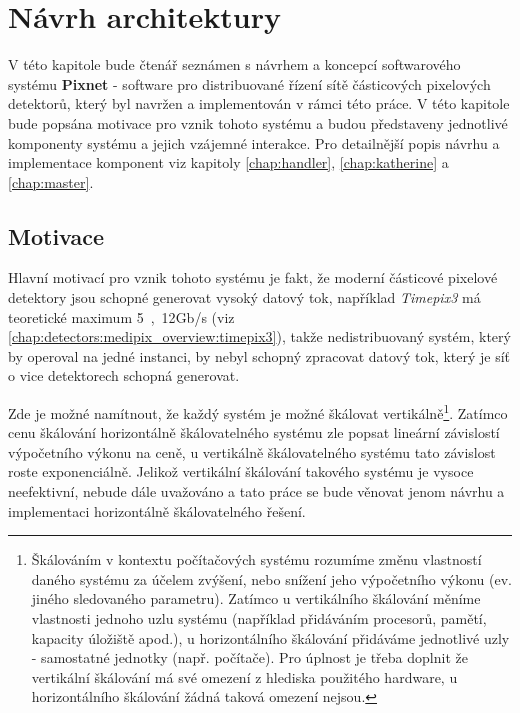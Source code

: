 

\chapter{Návrh architektury}\label{chap:arch}
V této kapitole bude čtenář seznámen s návrhem a koncepcí softwarového systému \textbf{Pixnet} - software pro distribuované řízení sítě částicových pixelových detektorů, který byl navržen a implementován v rámci této práce. V této kapitole bude popsána motivace pro vznik tohoto systému a budou představeny jednotlivé komponenty systému a jejich vzájemné interakce. Pro detailnější popis návrhu a implementace komponent viz kapitoly \ref{chap:handler}, \ref{chap:katherine} a \ref{chap:master}.

\section{Motivace}\label{chap:arch:motivation}
Hlavní motivací pro vznik tohoto systému je fakt, že moderní částicové pixelové detektory jsou schopné generovat vysoký datový tok, například \textit{Timepix3} má teoretické maximum \unit{5,12}{Gb/s} (viz \ref{chap:detectors:medipix_overview:timepix3}), takže nedistribuovaný systém, který by operoval na jedné instanci, by nebyl schopný zpracovat datový tok, který je síť o vice detektorech schopná generovat. 

Zde je možné namítnout, že každý systém je možné škálovat vertikálně\footnote{Škálováním v kontextu počítačových systému rozumíme změnu vlastností daného systému za účelem zvýšení, nebo snížení jeho výpočetního výkonu (ev. jiného sledovaného parametru). Zatímco u vertikálního škálování měníme vlastnosti jednoho uzlu systému (například přidáváním procesorů, pamětí, kapacity úložiště apod.), u horizontálního škálování přidáváme jednotlivé uzly - samostatné  jednotky (např. počítače). Pro úplnost je třeba doplnit že vertikální škálování má své omezení z hlediska použitého hardware, u horizontálního škálování žádná taková omezení nejsou.}. Zatímco cenu škálování horizontálně škálovatelného systému zle popsat lineární závislostí výpočetního výkonu na ceně, u vertikálně škálovatelného systému tato závislost roste exponenciálně. Jelikož vertikální škálování takového systému je  vysoce neefektivní, nebude dále uvažováno a tato práce se bude věnovat jenom návrhu a implementaci horizontálně škálovatelného řešení.

